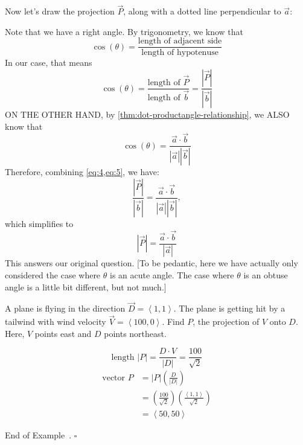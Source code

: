 \documentclass[10pt]{article}
\theoremstyle{definition}
\newtheorem{example}[theorem]{Example}
\renewenvironment{example}
{\begin{oldexample}}
  {\par\smallskip\hfill   End of Example~\theexample. $\square$    \par\end{oldexample}}
\newcommand{\1}[1]{\textbf{1}_{\left[#1\right]}} %
\begin{document}
Now let's draw the projection $\vec{P}$, along with a dotted line perpendicular to $\vec{a}$:

\begin{center}
\end{center}
Note that we have a right angle. By trigonometry, we know that
\begin{equation*}
  \cos(\theta) = \frac{\text{length of adjacent side}}{\text{length of hypotenuse}}
\end{equation*}
In our case, that means
\begin{equation}
  \label{eq:4}
  \cos(\theta) = \frac{\text{length of }\vec{P}}{\text{length of }\vec{b}} = \frac{|\vec{P}|}{|\vec{b}|}
\end{equation}
ON THE OTHER HAND, by \cref{thm:dot-productangle-relationship}, we ALSO know that
\begin{equation}
  \label{eq:5}
  \cos(\theta) = \frac{\vec{a}\cdot \vec{b}}{|\vec{a}||\vec{b}|}
\end{equation}
Therefore, combining \cref{eq:4,eq:5}, we have:
\begin{equation*}
  \frac{|\vec{P}|}{|\vec{b}|} =  \frac{\vec{a}\cdot \vec{b}}{|\vec{a}||\vec{b}|},
\end{equation*}
which simplifies to
\begin{equation*}
  \boxed{|\vec{P}| =  \frac{\vec{a}\cdot \vec{b}}{|\vec{a}|}}
\end{equation*}
This answers our original question. [To be pedantic, here we have actually only considered the case where
$\theta$ is an acute angle. The case where $\theta$ is an obtuse angle is a little bit different, but not
much.]



\begin{example}
  A plane is flying in the direction $\vec{D}=\left\langle 1,1 \right\rangle $. The plane is getting hit
  by a tailwind with wind velocity $\vec{V}=\left\langle 100,0 \right\rangle$. Find $P$, the projection
  of $V$ onto $D$. Here, $V$ points east and $D$ points northeast.

  \begin{equation*}
    \text{length } |P| = \frac{D\cdot V}{|D|} = \frac{100}{\sqrt{2}}
  \end{equation*}
  \begin{align*}
    \text{vector } P 
    &=  |P|   \left( \frac{D}{|D|} \right) \\
    &= \left( \frac{100}{\sqrt{2}} \right) \left(\frac{ \left\langle 1,1 \right\rangle}{\sqrt{2}}  \right) \\
    &=\left\langle 50,50 \right\rangle 
  \end{align*}
\end{example}
\end{document}
